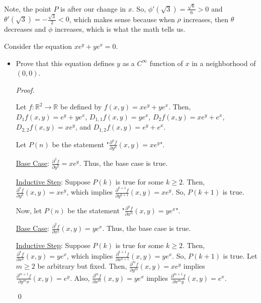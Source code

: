 \documentclass[12pt]{article}
\newenvironment{problem}[2][Problem]{\begin{trivlist}
\item[\hskip \labelsep {\bfseries #1}\hskip \labelsep {\bfseries
#2.}]}{\end{trivlist}}
\newenvironment{sol}
    {\emph{Proof.}
    }
    {
    \qed
    }
\begin{document}
\begin{problem}{23}
\begin{itemize}
    Note, the point $P$ is after our change in $x$. So, $\phi'(\sqrt{3}) = \frac{\sqrt{6}}{6} > 0$ and $\theta'(\sqrt{3}) = -\frac{\sqrt{3}}{2} < 0$, which makes sense because when $\rho$ increases, then $\theta$ decreases and $\phi$ increases, which is what the math tells us.
\end{itemize}
\end{problem}


\begin{problem}{24}
Consider the equation $xe^y + ye^x = 0$. 

\begin{itemize}
    \item[(a)] Prove that this equation defines $y$ as a $C^\infty$ function of $x$ in a neighborhood of $(0,0)$.
    
    \begin{sol}
    Let $f : \mathbb{R}^2 \to \mathbb{R}$ be defined by $f(x,y) = xe^y + ye^x$. Then, $D_1f(x,y) = e^y + ye^x$, $D_{1,1}f(x,y) = ye^x$, $D_2f(x,y) = xe^y + e^x$, $D_{2,2}f(x,y) = xe^y$, and $D_{1,2}f(x,y) = e^y+e^x$.
    
    \vspace{1em}
    
    Let $P(n)$ be the statement "$\frac{\partial^n f}{\partial y^n}(x,y) = xe^y$".
    
    \underline{Base Case}: $\frac{\partial^2 f}{\partial y^2} = xe^y$. Thus, the base case is true. 
    
    \underline{Inductive Step}: Suppose $P(k)$ is true for some $k \geq 2$. Then, $\frac{\partial^k f}{\partial y^k}(x,y) = xe^y$, which implies $\frac{\partial^{k+1}f}{\partial y^{k+1}}(x,y) = xe^y$. So, $P(k+1)$ is true.
    
    \vspace{1em}
    
    Now, let $P(n)$ be the statement "$\frac{\partial^n f}{\partial x^n}(x,y) = ye^x$".
    
    \underline{Base Case}: $\frac{\partial^2 f}{\partial x^2}(x,y) = ye^x$. Thus, the base case is true. 
    
    \underline{Inductive Step}: Suppose $P(k)$ is true for some $k \geq 2$. Then, $\frac{\partial^k f}{\partial x^k}(x,y) = ye^x$, which implies $\frac{\partial^{k+1}f}{\partial x^{k+1}}(x,y) = ye^x$. So, $P(k+1)$ is true. Let $m \geq 2$ be arbitrary but fixed. Then, $\frac{\partial^m f}{\partial y^m}(x,y) = xe^y$ implies $\frac{\partial^{m+1} f}{\partial y^mx}(x,y) = e^y$. Also, $\frac{\partial^m f}{\partial x^m}(x,y) = ye^x$ implies $\frac{\partial^{m+1} f}{\partial x^my}(x,y) = e^x$. 
    

\end{sol}
\end{itemize}
\end{problem}
\end{document}
